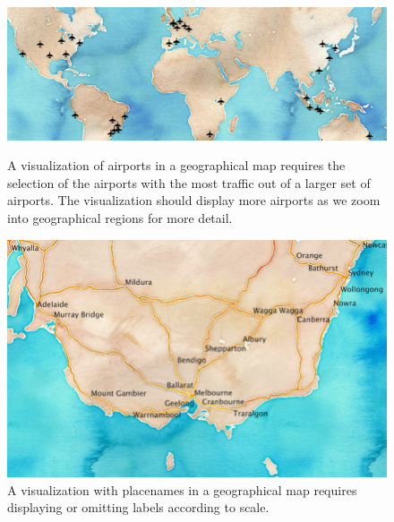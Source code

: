 \documentclass[11pt, oneside]{report}
\begin{document}
\begin{figure}[!t]
     \begin{minipage}{0.62\linewidth}
        \centerline{\includegraphics[width=0.99\linewidth]{figs-glossy/airports.png}}
        \vspace{-1ex}
        \caption{A visualization of airports in a geographical map requires the selection of the airports with the most traffic out of a larger set of airports. The visualization should display more airports as we zoom into geographical regions for more detail.}\label{fig:example:airports}
    \end{minipage} \hfill
       \begin{minipage}{0.36\linewidth}
        \centerline{\includegraphics[width=0.96\linewidth]{figs-glossy/placenames_viz.png}}
        \vspace{-1ex}
        \caption{A visualization with placenames in a geographical map requires displaying or omitting labels according to scale.} \label{fig:example:placenames}
    \end{minipage} \hfill
\end{figure}
 
\end{document}
